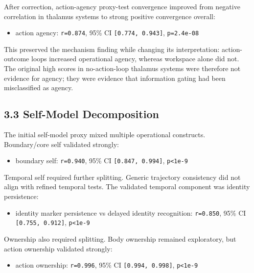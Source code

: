 \documentclass[
  11pt,
  letterpaper,
]{article}
\providecommand{\tightlist}{%
  \setlength{\itemsep}{0pt}\setlength{\parskip}{0pt}}
\begin{document}
After correction, action-agency proxy-test convergence improved from
negative correlation in thalamus systems to strong positive convergence
overall:

\begin{itemize}
\tightlist
\item
  action agency: \texttt{r=0.874}, 95\% CI \texttt{{[}0.774,\ 0.943{]}},
  \texttt{p=2.4e-08}
\end{itemize}

This preserved the mechanism finding while changing its interpretation:
action-outcome loops increased operational agency, whereas workspace
alone did not. The original high scores in no-action-loop thalamus
systems were therefore not evidence for agency; they were evidence that
information gating had been misclassified as agency.

\subsection{3.3 Self-Model
Decomposition}\label{self-model-decomposition}

The initial self-model proxy mixed multiple operational constructs.
Boundary/core self validated strongly:

\begin{itemize}
\tightlist
\item
  boundary self: \texttt{r=0.940}, 95\% CI \texttt{{[}0.847,\ 0.994{]}},
  \texttt{p\textless{}1e-9}
\end{itemize}

Temporal self required further splitting. Generic trajectory consistency
did not align with refined temporal tests. The validated temporal
component was identity persistence:

\begin{itemize}
\tightlist
\item
  identity marker persistence vs delayed identity recognition:
  \texttt{r=0.850}, 95\% CI \texttt{{[}0.755,\ 0.912{]}},
  \texttt{p\textless{}1e-9}
\end{itemize}

Ownership also required splitting. Body ownership remained exploratory,
but action ownership validated strongly:

\begin{itemize}
\tightlist
\item
  action ownership: \texttt{r=0.996}, 95\% CI
  \texttt{{[}0.994,\ 0.998{]}}, \texttt{p\textless{}1e-9}
\end{itemize}
\end{document}
